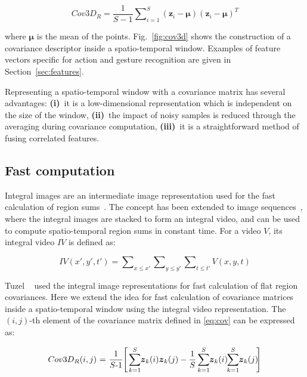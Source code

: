 \documentclass[10pt,twocolumn,letterpaper]{article}
\newcommand{\fig}[1]{\mbox{Fig.~\ref{#1}}}
\newcommand{\eqsize}{\footnotesize}
\newcommand{\cov}{{Cov3D}}
\newcommand{\vect}[1]{{\boldsymbol{#1}}}
\begin{document}
\vspace{-1ex}
\eqsize
\begin{equation}
  \cov_R = \frac{1}{S-1} \sum\nolimits_{i=1}^S(\vect{z}_i-\vect{\mu})(\vect{z}_i-\vect{\mu})^T
  \label{eq:cov}
\end{equation}
\normalsize

\noindent
where {\eqsize $\vect{\mu}$} is the mean of the points.
\fig{fig:cov3d} shows the construction of a covariance descriptor inside a spatio-temporal window.
Examples of feature vectors specific for action and gesture recognition are given in Section~\ref{sec:features}.

Representing a spatio-temporal window with a covariance matrix has several advantages:
{\bf (i)}~it is a low-dimensional representation which is independent on the size of the window,
{\bf (ii)}~the impact of noisy samples is reduced through the averaging during covariance computation,
{\bf (iii)}~it is a straightforward method of fusing correlated features.




\subsection{Fast computation}
\label{sec:integral}

Integral images are an intermediate image representation used for the fast calculation of region sums~\cite{ViolaAndJones2001}.
The concept has been extended to image sequences~\cite{KeEtAl2005},
where the integral images are stacked to form an integral video,
and can be used to compute spatio-temporal region sums in constant time.
For a video {\eqsize $V$}, its integral video {\eqsize $IV$} is defined as:

\vspace{-1ex}
\eqsize
\begin{equation}
  IV(x',y',t') = \sum\nolimits_{x \leq x'} \sum\nolimits_{y \leq y'} \sum\nolimits_{t \leq t'} V(x,y,t)
\end{equation}
\normalsize

Tuzel \etal~\cite{TuzelEtAl2008} used the integral image representations for fast calculation of flat region covariances.
Here we extend the idea for fast calculation of covariance matrices inside a spatio-temporal window using the integral video representation.
The {\eqsize $(i,j)$}-th element of the covariance matrix defined in \eqref{eq:cov} can be expressed as:

\noindent
\eqsize
\begin{equation}
  \cov_R(i,j)
  \mbox{~=~}
  \frac{1}{S \mbox{-} 1}
  \hspace{-0.5ex}
  \left[
    \hspace{0.3ex}
    \sum_{k=1}^S \hspace{-0.5ex} \vect{z}_k(i)\vect{z}_k(j) - \frac{1}{S} \sum_{k=1}^S \hspace{-0.5ex} \vect{z}_k(i) \hspace{-0.6ex} \sum_{k=1}^S \hspace{-0.5ex} \vect{z}_k(j)
    \hspace{-0.5ex}
  \right]
\end{equation}
\normalsize
\end{document}
